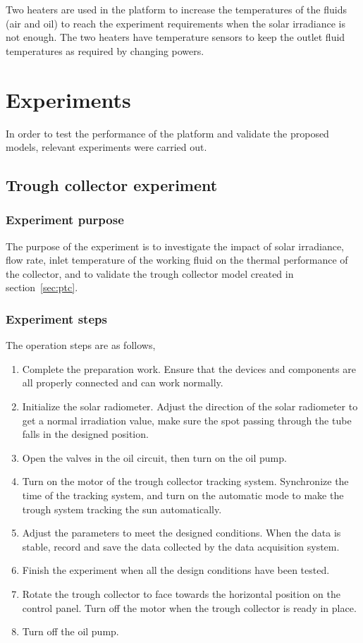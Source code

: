 Two heaters are used in the platform to increase the temperatures of the fluids (air and oil) to reach the experiment requirements when the solar irradiance is not enough. The two heaters have temperature sensors to keep the 
outlet fluid temperatures as required by changing powers.
 


\section{Experiments}

In order to test the performance of the platform and validate the proposed models, relevant experiments were carried out.
\subsection{Trough collector experiment}
\subsubsection{Experiment purpose}
The purpose of the experiment is to investigate the impact of solar irradiance, flow rate, inlet temperature of the working fluid on the thermal performance of the collector, and to validate the trough collector model created in section~\ref{sec:ptc}. 
\subsubsection{Experiment steps}
The operation steps are as follows,
\begin{enumerate}[label=(\arabic*)]
	\item Complete the preparation work. Ensure that the devices and components are all properly connected and can work normally.
	\item Initialize the solar radiometer. Adjust the direction of the solar radiometer to get a normal irradiation value, make sure the spot passing through the tube falls in the designed position.
	\item Open the valves in the oil circuit, then turn on the oil pump.
	\item Turn on the motor of the trough collector tracking system. Synchronize the time of the tracking system, and turn on the automatic mode to make the trough system tracking the sun automatically.
	\item Adjust the parameters to meet the designed conditions. When the data is stable, record and save the data collected by the data acquisition system.
	\item Finish the experiment when all the design conditions have been tested.
	\item Rotate the trough collector to face towards the horizontal position on the control panel. Turn off the motor when the trough collector is ready in place.
	\item Turn off the oil pump.
\end{enumerate}

